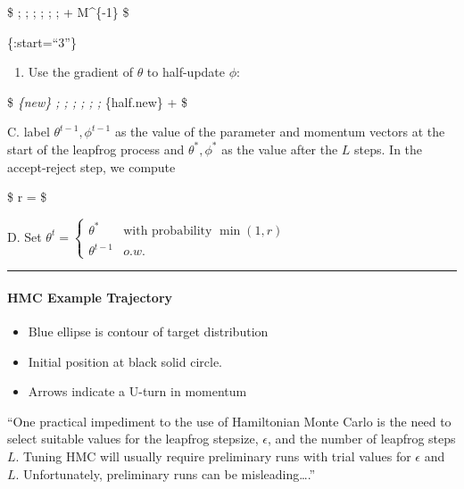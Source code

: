 \documentclass[
]{book}
\providecommand{\tightlist}{%
  \setlength{\itemsep}{0pt}\setlength{\parskip}{0pt}}
\begin{document}
\$
\theta ; ; ; \leftarrow ; ; ; \theta + \epsilon \ast M\^{}\{-1\} \phi
\$

\{:start=``3''\}

\begin{enumerate}
\def\labelenumi{\arabic{enumi}.}
\setcounter{enumi}{2}
\tightlist
\item
  Use the gradient of \(\theta\) to half-update \(\phi\):
\end{enumerate}

\$
\phi\emph{\{new\} ; ; ; \leftarrow ; ; ; \phi}\{half.new\} +  \epsilon \ast {}
\$

C. label \(\theta^{t-1}, \phi^{t-1}\) as the value of the parameter and momentum vectors at the start of the leapfrog process and \(\theta^{\ast}, \phi^{\ast}\) as the value after the \(L\) steps. In the accept-reject step, we compute

\$
r =  
\$

D. Set \(\theta^t = \begin{cases} \theta^\ast & \text{with probability } \min(1,r) \\ \theta^{t-1} & o.w. \end{cases}\)

\begin{center}\rule{0.5\linewidth}{0.5pt}\end{center}

\hypertarget{hmc-example-trajectory}{%
\paragraph{HMC Example Trajectory}\label{hmc-example-trajectory}}

\begin{itemize}
\tightlist
\item
  Blue ellipse is contour of target distribution
\item
  Initial position at black solid circle.
\item
  Arrows indicate a U-turn in momentum
\end{itemize}

``One practical impediment to the use of Hamiltonian Monte Carlo is the need to select suitable values for the leapfrog stepsize, \(\epsilon\), and the number of leapfrog steps \(L\). Tuning HMC will usually require preliminary runs with trial values for \(\epsilon\) and \(L\). Unfortunately, preliminary runs can be misleading\ldots.''
\end{document}
